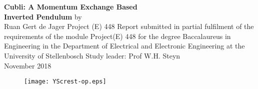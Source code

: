 \begin{titlepage}
	\centering
	\vfill
	{\textbf{\Huge
			Cubli: A Momentum Exchange Based\\ 
			\vskip0.5cm
			Inverted Pendulum}
		\vskip0.5cm
		\normalsize by \\
		\vskip0.5cm
		\Large Ruan Gert de Jager 
		\vskip1cm
		\large Project (E) 448 
		\vskip2cm
		\small Report submitted in partial fulfilment of the requirements of
		the module Project(E) 448 for the degree Baccalaureus in
		Engineering in the Department of Electrical and Electronic
		Engineering at the University of Stellenbosch 
		\vskip2cm
		\large Study leader: Prof W.H. Steyn\\
		\vskip2cm
		\large November 2018\\
	}    
	\vfill
	\begin{figure}[t!]
		\texttt{[image: YScrest-op.eps]}
		\centering
		\vskip0.5cm
	\end{figure}
	\vfill
	\vfill
\end{titlepage}